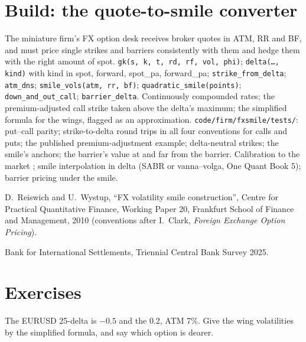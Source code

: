 \section{Build: the quote-to-smile converter}\label{bld:m2:the-fx-options-market:fxsmile}

\begin{build}
 The miniature firm's FX option desk receives broker quotes in
ATM, RR and BF, and must price single strikes and barriers consistently with them
and hedge them with the right amount of spot.
 \texttt{gk(s, k, t, rd, rf, vol, phi)}; \texttt{delta(\ldots,
kind)} with kind in spot, forward, spot\_pa, forward\_pa;
\texttt{strike\_from\_delta}; \texttt{atm\_dns}; \texttt{smile\_vols(atm, rr, bf)};
\texttt{quadratic\_smile(points)}; \texttt{down\_and\_out\_call};
\texttt{barrier\_delta}.
 Continuously compounded rates; the premium-adjusted call strike
taken above the delta's maximum; the simplified formula for the wings, flagged as
an approximation.
 \texttt{code/firm/fxsmile/tests/}: put--call parity;
strike-to-delta round trips in all four conventions for calls and puts; the
published premium-adjustment example; delta-neutral strikes; the smile's
anchors; the barrier's value at and far from the barrier.
 Calibration to the market ; smile interpolation in delta
(SABR or vanna--volga, One Quant Book 5); barrier pricing under the smile.
\end{build}

\begin{omsources}
\item D.~Reiswich and U.~Wystup, ``FX volatility smile construction'', Centre for
Practical Quantitative Finance, Working Paper 20, Frankfurt School of Finance and
Management, 2010 (conventions after I.~Clark, \emph{Foreign Exchange Option
Pricing}).
\item Bank for International Settlements, Triennial Central Bank Survey 2025.
\end{omsources}

\section{Exercises}

\begin{exercise}[$\star$]\label{exo:m2:the-fx-options-market:1}
The EURUSD 25-delta  is $-0.5$ and the  0.2, ATM 7\%. Give the
wing volatilities by the simplified formula, and say which option is dearer.
\end{exercise}

